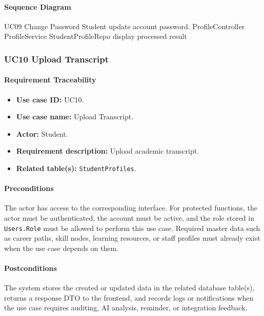 \paragraph{Sequence Diagram}

\SequenceDiagram
{UC09 Change Password}
{Student}
{update account password.}
{ProfileController}
{ProfileService}
{StudentProfileRepo}
{display processed result}

\subsubsection{UC10 Upload Transcript}

\paragraph{Requirement Traceability}

\begin{itemize}
    \item \textbf{Use case ID:} UC10.
    \item \textbf{Use case name:} Upload Transcript.
    \item \textbf{Actor:} Student.
    \item \textbf{Requirement description:} Upload academic transcript.
    \item \textbf{Related table(s):} \texttt{StudentProfiles}.
\end{itemize}

\paragraph{Preconditions}

The actor has access to the corresponding interface. For protected functions, the actor must be authenticated, the account must be active, and the role stored in \texttt{Users.Role} must be allowed to perform this use case. Required master data such as career paths, skill nodes, learning resources, or staff profiles must already exist when the use case depends on them.

\paragraph{Postconditions}

The system stores the created or updated data in the related database table(s), returns a response DTO to the frontend, and records logs or notifications when the use case requires auditing, AI analysis, reminder, or integration feedback.

